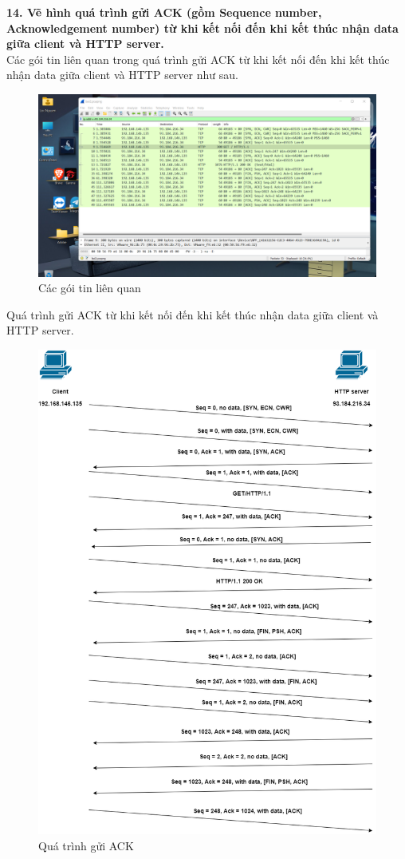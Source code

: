 \textbf{14. Vẽ hình quá trình gửi ACK (gồm Sequence number, Acknowledgement number) từ khi kết nối đến khi kết thúc nhận data giữa client và HTTP server.}\\
Các gói tin liên quan trong quá trình gửi ACK từ khi kết nối đến khi kết thúc nhận data giữa client và HTTP server như sau.
\begin{figure}[H]
\begin{center}
\includegraphics[scale=.6]{../figures/p2/p2_packets}
\end{center}
\caption{Các gói tin liên quan}
\end{figure}
Quá trình gửi ACK từ khi kết nối đến khi kết thúc nhận data giữa client và HTTP server.
\begin{figure}[H]
\begin{center}
\includegraphics[scale=.6]{../figures/p2/p2_diagram}
\end{center}
\caption{Quá trình gửi ACK}
\end{figure}



